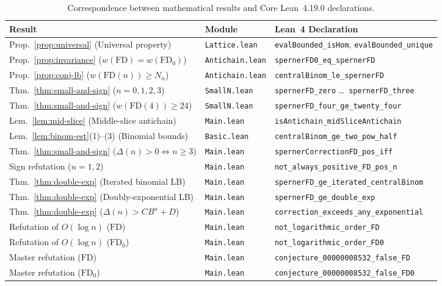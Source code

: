 \documentclass[11pt]{article}
\theoremstyle{definition}
\newcommand{\FD}{\mathrm{FD}}
\newcommand{\FDz}{\mathrm{FD}_0}
\begin{document}
\begin{table}[ht]
\centering
\caption{Correspondence between mathematical results and Core Lean~4.19.0 declarations.}
\label{tab:lean-map}
\smallskip
{\small
\begin{tabular}{@{}lll@{}}
\toprule
Result & Module & Lean~4 Declaration \\
\midrule
Prop.~\ref{prop:universal} (Universal property) & \texttt{Lattice.lean} & \texttt{evalBounded\_isHom}, \texttt{evalBounded\_unique} \\
Prop.~\ref{prop:invariance} ($w(\FD) = w(\FDz)$) & \texttt{Antichain.lean} & \texttt{spernerFD0\_eq\_spernerFD} \\
Prop.~\ref{prop:conj-lb} ($w(\FD(n)) \ge N_n$) & \texttt{Antichain.lean} & \texttt{centralBinom\_le\_spernerFD} \\
Thm.~\ref{thm:small-and-sign} ($n = 0,1,2,3$) & \texttt{SmallN.lean} & \texttt{spernerFD\_zero} \dots\ \texttt{spernerFD\_three} \\
Thm.~\ref{thm:small-and-sign} ($w(\FD(4)) \ge 24$) & \texttt{SmallN.lean} & \texttt{spernerFD\_four\_ge\_twenty\_four} \\
Lem.~\ref{lem:mid-slice} (Middle-slice antichain) & \texttt{Main.lean} & \texttt{isAntichain\_midSliceAntichain} \\
Lem.~\ref{lem:binom-est}(1)--(3) (Binomial bounds) & \texttt{Basic.lean} & \texttt{centralBinom\_ge\_two\_pow\_half} \\
Thm.~\ref{thm:small-and-sign} ($\Delta(n) > 0 \iff n \ge 3$) & \texttt{Main.lean} & \texttt{spernerCorrectionFD\_pos\_iff} \\
Sign refutation ($n = 1, 2$) & \texttt{Main.lean} & \texttt{not\_always\_positive\_FD\_pos\_n} \\
Thm.~\ref{thm:double-exp} (Iterated binomial LB) & \texttt{Main.lean} & \texttt{spernerFD\_ge\_iterated\_centralBinom} \\
Thm.~\ref{thm:double-exp} (Doubly-exponential LB) & \texttt{Main.lean} & \texttt{spernerFD\_ge\_double\_exp} \\
Thm.~\ref{thm:double-exp} ($\Delta(n) > C B^n + D$) & \texttt{Main.lean} & \texttt{correction\_exceeds\_any\_exponential} \\
Refutation of $O(\log n)$ ($\FD$) & \texttt{Main.lean} & \texttt{not\_logarithmic\_order\_FD} \\
Refutation of $O(\log n)$ ($\FDz$) & \texttt{Main.lean} & \texttt{not\_logarithmic\_order\_FD0} \\
Master refutation ($\FD$) & \texttt{Main.lean} & \texttt{conjecture\_00000008532\_false\_FD} \\
Master refutation ($\FDz$) & \texttt{Main.lean} & \texttt{conjecture\_00000008532\_false\_FD0} \\
\bottomrule
\end{tabular}
}
\end{table}
\end{document}

